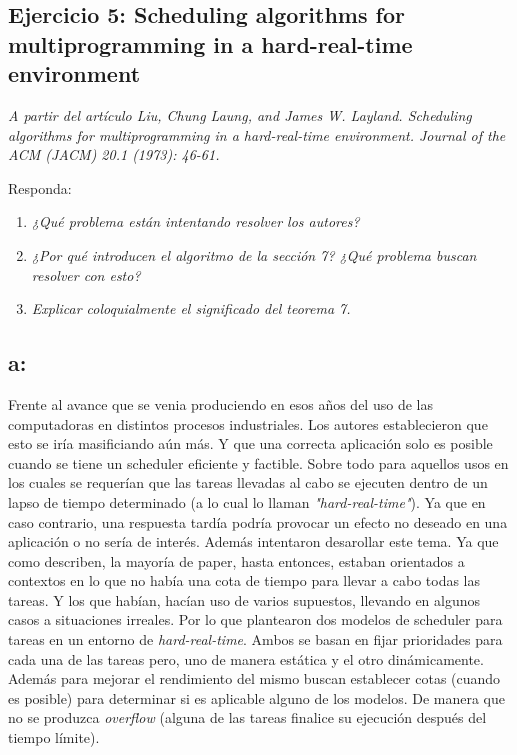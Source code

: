 \documentclass[a4paper]{article}
\begin{document}
\newpage

 \subsection{Ejercicio 5: Scheduling algorithms for multiprogramming in a hard-real-time environment}
 
\textit{A partir del art\'iculo Liu, Chung Laung, and James W. Layland. Scheduling algorithms for multiprogramming in a hard-real-time environment. Journal of the ACM (JACM) 20.1 (1973): 46-61.}\newline

Responda:
\begin{enumerate}
\item \textit{¿Qu\'e problema est\'an intentando resolver los autores?}

\item \textit{¿Por qu\'e introducen el algoritmo de la secci\'on 7? ¿Qu\'e problema buscan resolver con esto?}

\item  \textit{Explicar coloquialmente el significado del teorema 7.}

\end{enumerate}

\subsection{a:}

Frente al avance que se venia produciendo en esos años del uso de las computadoras en distintos procesos industriales. Los autores establecieron que esto se iría masificiando aún más. Y que una correcta aplicación solo es posible cuando se tiene un scheduler eficiente y factible. Sobre todo para aquellos usos en los cuales se requerían que las tareas llevadas al cabo se ejecuten dentro de un lapso de tiempo determinado (a lo cual lo llaman \textit{"hard-real-time"}). Ya que en caso contrario, una respuesta tardía podría provocar un efecto no deseado en una aplicación o no sería de interés. Además intentaron desarollar este tema. Ya que como describen, la mayoría de paper, hasta entonces, estaban orientados a contextos en lo que no había una cota de tiempo para llevar a cabo todas las tareas. Y los que habían, hacían uso de varios supuestos, llevando en algunos casos a situaciones irreales. Por lo que plantearon dos modelos de scheduler para tareas en un entorno de \textit{hard-real-time}. Ambos se basan en fijar prioridades para cada una de las tareas pero, uno de manera estática y el otro dinámicamente. Además para mejorar el rendimiento del mismo buscan establecer cotas (cuando es posible) para determinar si es aplicable alguno de los modelos. De manera que no se produzca \textit{overflow} (alguna de las tareas finalice su ejecución después del tiempo límite).
\end{document}
